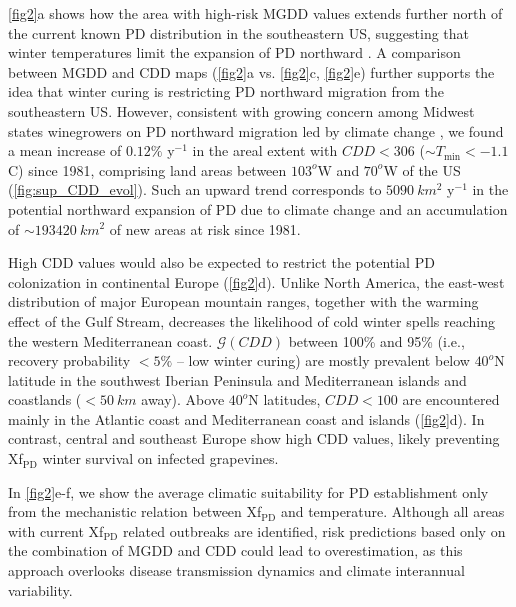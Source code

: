     \cref{fig2}a shows how the area with high-risk MGDD values extends further
    north of the current known PD distribution in the southeastern US,
    suggesting
    that winter temperatures limit the expansion of PD northward
    \cite{Hopkins2002}. A comparison between MGDD and CDD maps (\cref{fig2}a
    vs.
    \cref{fig2}c, \cref{fig2}e) further supports the idea that winter curing is
    restricting PD northward migration from the southeastern US. However,
    consistent with growing concern among Midwest states winegrowers on PD
    northward migration led by climate change \cite{Galvez2010}, we found a
    mean
    increase of $0.12 \%$ y$^{-1}$ in the areal extent with $CDD < 306$ ($\sim
T_{\textrm{min}} < -1.1$ \textdegree C) since 1981, comprising land areas
    between $103^o$W and $70^o$W of the US (\cref{fig:sup_CDD_evol}). Such an
    upward
    trend corresponds to $\SI{5090}{km^2}$ y$^{-1}$ in the potential northward
    expansion of PD due to climate change and an accumulation of $\sim
\SI{193420}{km^2}$ of new areas at risk since 1981.

    High CDD values would also be expected to restrict the potential PD
    colonization in continental Europe (\cref{fig2}d). Unlike North America,
    the east-west distribution of major European mountain ranges, together with
    the warming effect of the Gulf Stream, decreases the likelihood of cold
    winter spells reaching the western Mediterranean coast. $\mathcal{G}(CDD)$
    between 100\% and 95\% (i.e., recovery probability $<5\%$ -- low winter
    curing) are mostly prevalent below $40^o$N latitude in the southwest
    Iberian Peninsula and Mediterranean islands and coastlands ($<\SI{50}{km}$
    away). Above $40^o$N latitudes, $CDD < 100$ are encountered mainly in the
    Atlantic coast and Mediterranean coast and islands (\cref{fig2}d). In
    contrast, central and southeast Europe show high CDD values, likely
    preventing Xf$_{\textrm{PD}}$ winter survival on infected grapevines.

    In \cref{fig2}e-f, we show the average climatic suitability for PD
    establishment only from the mechanistic relation between Xf$_{\textrm{PD}}$
    and
    temperature. Although all areas with current Xf$_{\textrm{PD}}$ related
    outbreaks are identified, risk predictions based only on the combination of
    MGDD and CDD could lead to overestimation, as this approach overlooks
    disease transmission dynamics and climate interannual variability.

